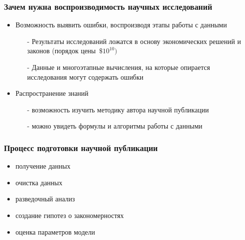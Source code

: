 \documentclass[10pt,pdf,hyperref={unicode}]{beamer}
\begin{document}
\begin{frame} 
	\frametitle [Зачем нужна воспроизводимость] {Зачем нужна воспроизводимость научных исследований }
\begin{itemize}
\item Возможность выявить ошибки, воспроизводя этапы работы с данными  
\begin{itemize}
	\item[-] Результаты исследований ложатся в основу экономических решений и законов (порядок цены~$\$10^{10})$
	\item[-] Данные и многоэтапные  вычисления, на которые опирается исследования могут содержать ошибки
\end{itemize}
\item  Распространение знаний
    \begin{itemize}
       \item[-] возможность изучить методику автора научной публикации
       \item[-] можно увидеть формулы и алгоритмы работы с данными  
    \end{itemize}
    
\end{itemize}
\end{frame}	
\begin{frame}
	\frametitle{Процесс подготовки научной публикации}
\begin{itemize}
\item	получение данных 
\item   очистка данных 
\item   разведочный анализ
\item   создание гипотез о закономерностях
\item   оценка параметров модели
   
  
\end{itemize}	

\end{frame}
\end{document}
